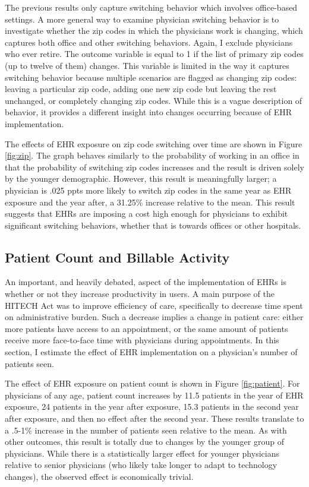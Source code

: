 \documentclass[11pt]{article}
\begin{document}
The previous results only capture switching behavior which involves office-based settings. A more general way to examine physician switching behavior is to investigate whether the zip codes in which the physicians work is changing, which captures both office and other switching behaviors. Again, I exclude physicians who ever retire. The outcome variable is equal to 1 if the list of primary zip codes (up to twelve of them) changes. This variable is limited in the way it captures switching behavior because multiple scenarios are flagged as changing zip codes: leaving a particular zip code, adding one new zip code but leaving the rest unchanged, or completely changing zip codes. While this is a vague description of behavior, it provides a different insight into changes occurring because of EHR implementation.

The effects of EHR exposure on zip code switching over time are shown in Figure \ref{fig:zip}. The graph behaves similarly to the probability of working in an office in that the probability of switching zip codes increases and the result is driven solely by the younger demographic. However, this result is meaningfully larger; a physician is .025 ppts more likely to switch zip codes in the same year as EHR exposure and the year after, a 31.25\% increase relative to the mean. This result suggests that EHRs are imposing a cost high enough for physicians to exhibit significant switching behaviors, whether that is towards offices or other hospitals.




\subsection{Patient Count and Billable Activity}\label{sec:patientcount}

An important, and heavily debated, aspect of the implementation of EHRs is whether or not they increase productivity in users. A main purpose of the HITECH Act was to improve efficiency of care, specifically to decrease time spent on administrative burden. Such a decrease implies a change in patient care: either more patients have access to an appointment, or the same amount of patients receive more face-to-face time with physicians during appointments. In this section, I estimate the effect of EHR implementation on a physician's number of patients seen. 

The effect of EHR exposure on patient count is shown in Figure \ref{fig:patient}. For physicians of any age, patient count increases by 11.5 patients in the year of EHR exposure, 24 patients in the year after exposure, 15.3 patients in the second year after exposure, and then no effect after the second year. These results translate to a .5-1\% increase in the number of patients seen relative to the mean. As with other outcomes, this result is totally due to changes by the younger group of physicians. While there is a statistically larger effect for younger physicians relative to senior physicians (who likely take longer to adapt to technology changes), the observed effect is economically trivial. 
\end{document}
